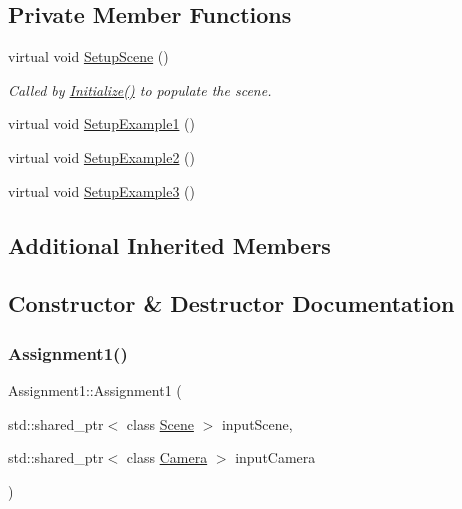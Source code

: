 \subsection*{Private Member Functions}
\begin{DoxyCompactItemize}
\item
virtual void \hyperlink{class_assignment1_a8d12cf21f1463caa5a8da45110b50103}{Setup\+Scene} ()
\begin{DoxyCompactList}\small\item\em Called by \hyperlink{class_application_a17cf1ea4552d26a1c20f7d98d793d41d}{Initialize()} to populate the scene. \end{DoxyCompactList}\item
virtual void \hyperlink{class_assignment1_a07743a6d86f7603dd58339c4db1de192}{Setup\+Example1} ()
\item
virtual void \hyperlink{class_assignment1_aeabed7b579d59a6fdacaeab468afba29}{Setup\+Example2} ()
\item
virtual void \hyperlink{class_assignment1_afbb3cb7765b899e69c9847d29f045392}{Setup\+Example3} ()
\end{DoxyCompactItemize}
\subsection*{Additional Inherited Members}


\subsection{Constructor \& Destructor Documentation}
\hypertarget{class_assignment1_ade9ef18c233dab37d37f20760fe7674d}{}\label{class_assignment1_ade9ef18c233dab37d37f20760fe7674d}
\subsubsection{\texorpdfstring{Assignment1()}{Assignment1()}}
{\footnotesize\ttfamily Assignment1\+::\+Assignment1 (\begin{DoxyParamCaption}\item[{std\+::shared\+\_\+ptr$<$ class \hyperlink{class_scene}{Scene} $>$}]{input\+Scene,  }\item[{std\+::shared\+\_\+ptr$<$ class \hyperlink{class_camera}{Camera} $>$}]{input\+Camera }\end{DoxyParamCaption})}



